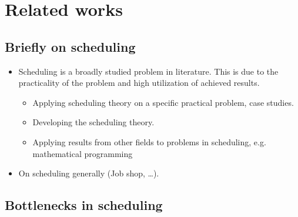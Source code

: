 \chapter{Related works}

\section*{Briefly on scheduling}

\begin{itemize}
    \item Scheduling is a broadly studied problem in literature. This is due to the practicality
        of the problem and high utilization of achieved results.
    \begin{itemize}
        \item Applying scheduling theory on a specific practical problem, case studies.
        \item Developing the scheduling theory.
        \item Applying results from other fields to problems in scheduling, e.g. mathematical programming
            \citep{KNOP2018}
    \end{itemize}        

    \item On scheduling generally (Job shop, \dots).

\end{itemize}
    
\section*{Bottlenecks in scheduling}

